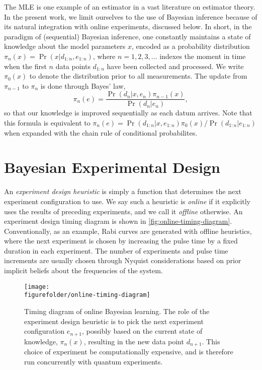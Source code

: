 \documentclass[aps,nofootinbib,twocolumn,superscriptaddress]{revtex4}
\newcommand{\figurefolder}{../fig}
\newcommand{\mps}{x}
\newcommand{\eps}{e}
\newcommand{\data}{d}
\begin{document}
The MLE is one example of an estimator in a vast literature on estimator theory.
In the present work, we limit ourselves to the use of Bayesian inference because of its
natural integration with online experiments, discussed below.
In short, in the paradigm of (sequential) Bayesian inference, one constantly
maintains a state of knowledge about the model parameters $\mps$, encoded
as a probability distribution $\pi_n(\mps)=\Pr(\mps|\data_{1:n},\eps_{1:n})$,
where $n=1,2,3,...$ indexes the moment in time when the first $n$ data
points $\data_{1:n}$ have been collected and processed.
We write $\pi_0(x)$ to denote the distribution prior to all measurements.
The update from $\pi_{n-1}$ to $\pi_n$ is done through Bayes' law,
\begin{equation}
    \pi_n(\eps)
        = \frac{
            \Pr(\data_n|\mps,\eps_n)\pi_{n-1}(\mps)
        }{
            \Pr(\data_n|\eps_n)
        },
\end{equation}
so that our knowledge is improved sequentially as each datum arrives.
Note that this formula is equivalent to
$\pi_n(\eps)=\Pr(\data_{1:n}|\mps,\eps_{1:n})\pi_0(\mps)/\Pr(\data_{1:n}|\eps_{1:n})$ when expanded with the chain rule of conditional probabilites.

\section{Bayesian Experimental Design}
\label{sec:experimental-design}

An \textit{experiment design heuristic} is simply a function that
determines the next experiment configuration to use.
We say such a heuristic is \textit{online} if it explicitly uses the
results of preceding experiments, and we call it \textit{offline}
otherwise.
An experiment design timing diagram is shown in \autoref{fig:online-timing-diagram}.
Conventionally, as an example, Rabi curves are generated
with offline heuristics, where the next experiment is chosen by
increasing the pulse time by a fixed duration in each experiment.
The number of experiments and pulse time increments are usually
chosen through Nyquist considerations based on prior implicit
beliefs about the frequencies of the system.

\begin{figure*}
    \texttt{[image: \\figurefolder/online-timing-diagram]}
    \caption{Timing diagram of online Bayesian learning. The role of the
    experiment design heuristic is to pick the next experiment configuration
    $e_{n+1}$, possibly based
    on the current state of knowledge, $\pi_n(\mps)$, resulting in the
    new data point $d_{n+1}$.
    This choice of experiment be computationally expensive, and is
    therefore run concurrently with quantum experiments.}
    \label{fig:online-timing-diagram}
\end{figure*}
\end{document}
